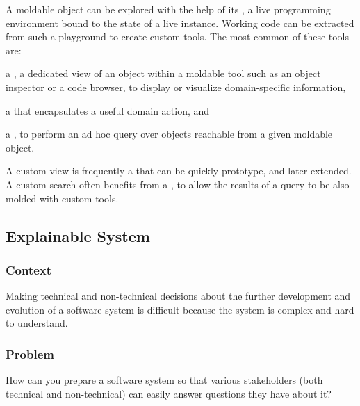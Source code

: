\documentclass[sigconf]{acmart}
\begin{document}
A moldable object can be explored with the help of its , a live programming environment bound to the state of a live instance.
Working code can be extracted from such a playground to create custom tools.
The most common of these tools are:
\begin{inparaenum}[(i)]
\item a , a dedicated view of an object within a moldable tool such as an object inspector or a code browser, to display or visualize domain-specific information,
\item a  that encapsulates a useful domain action, and
\item a , to perform an ad hoc query over objects reachable from a given moldable object.
\end{inparaenum}
A custom view is frequently a  that can be quickly prototype, and later extended.
A custom search often benefits from a , to allow the results of a query to be also molded with custom tools.



\subsection*{Explainable System}\label{pat:explainableSystem}

\subsubsection*{Context}
Making technical and non-technical decisions about the further development and evolution of a software system is difficult because the system is complex and hard to understand.

\subsubsection*{Problem}
How can you prepare a software system so that various stakeholders (both technical and non-technical) can easily answer questions they have about it?
\end{document}
